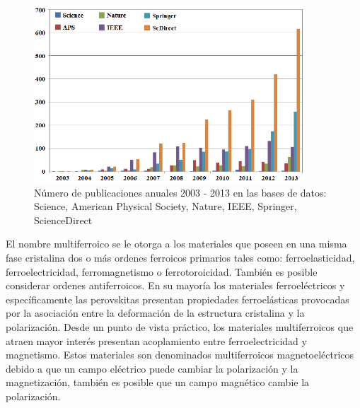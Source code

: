 \begin{figure}[H]
\centering
\includegraphics[width=0.9\textwidth]{contenido/introduccion/img_introduccion/EstadisticaPublicaciones.png}
\caption[Estad\'istica de publicaciones]{N\'umero de publicaciones anuales 
2003 - 2013 
en las bases de datos: Science, American Physical Society, Nature, IEEE, 
Springer, ScienceDirect}
\label{EstadisticaPublicaciones}
\end{figure}

\noindent El nombre multiferroico se le otorga a los materiales que poseen en una misma fase cristalina dos o m\'as ordenes ferroicos primarios tales como: ferroelasticidad, ferroelectricidad, ferromagnetismo o ferrotoroicidad. Tambi\'en es posible considerar ordenes  antiferroicos. En su mayor\'ia los materiales ferroel\'ectricos y espec\'ificamente las perovskitas presentan propiedades ferroel\'asticas provocadas por la asociaci\'on entre la deformaci\'on de la estructura cristalina y la polarizaci\'on. Desde un punto de vista pr\'actico, los materiales multiferroicos que atraen mayor inter\'es presentan acoplamiento entre ferroelectricidad y magnetismo. Estos materiales son denominados multiferroicos magnetoel\'ectricos debido a que un campo el\'ectrico puede cambiar la polarizaci\'on y la magnetizaci\'on, tambi\'en es posible que un campo magn\'etico cambie la polarizaci\'on.

